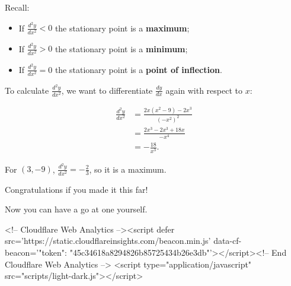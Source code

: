 \documentclass[
  a4paper,
]{scrbook}
\providecommand{\tightlist}{%
  \setlength{\itemsep}{0pt}\setlength{\parskip}{0pt}}
\begin{document}
Recall:

\begin{itemize}
\tightlist
\item
  If \(\frac{d^{2}y}{dx^{2}} < 0\) the stationary point is a
  \textbf{maximum};
\item
  If \(\frac{d^{2}y}{dx^{2}} > 0\) the stationary point is a
  \textbf{minimum};
\item
  If \(\frac{d^{2}y}{dx^{2}} = 0\) the stationary point is a
  \textbf{point of inflection}.
\end{itemize}

To calculate \(\frac{d^{2}y}{dx^{2}}\), we want to differentiate
\(\frac{dy}{dx}\) again with respect to \(x\):

\[
\begin{aligned}
\frac{d^{2}y}{dx^{2}} &= \frac{2x(x^{2} - 9) - 2x^{3}}{(- x^{2})^{2}} \\
&= \frac{2x^{3} - 2x^{3} + 18x}{- x^{4}} \\
&= - \frac{18}{x^{3}}.
\end{aligned}
\]

For \((3, - 9)\), \(\frac{d^{2}y}{dx^{2}} = - \frac{2}{3}\), so it is a
maximum.

Congratulations if you made it this far!

Now you can have a go at one yourself.


\backmatter

<!-- Cloudflare Web Analytics --><script defer src='https://static.cloudflareinsights.com/beacon.min.js' data-cf-beacon='{"token": "45c34618a8294826b85725434b26e3db"}'></script><!-- End Cloudflare Web Analytics -->
<script type="application/javascript" src="scripts/light-dark.js"></script>
\end{document}
